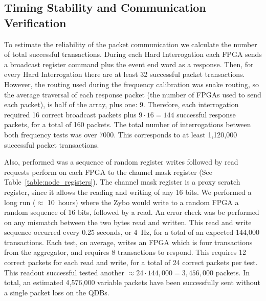 




\subsection{Timing Stability and Communication Verification}
\label{sec:timing_test_results}
To estimate the reliability of the packet communication we calculate the number of total successful transactions.
During each Hard Interrogation each FPGA sends a broadcast register command plus the event end word as a response.
Then, for every Hard Interrogation there are at least 32 successful packet transactions. 
However, the routing used during the frequency calibration was snake routing, so the average traversal of each response packet (the number of FPGAs used to send each packet), is half of the array, plus one: 9.
Therefore, each interrogation required 16 correct broadcast packets plus $9\cdot 16 = 144$ successful response packets, for a total of 160 packets.
The total number of interrogations between both frequency tests was over 7000.
This corresponds to at least 1,120,000 successful packet transactions.

Also, performed was a sequence of random register writes followed by read requests perform on each FPGA to the channel mask register (See Table~\ref{table:node_registers}).
The channel mask register is a proxy scratch register, since it allows the reading and writing of any 16 bits.
We performed a long run ($\approx$ 10~\unit{hours}) where the Zybo would write to a random FPGA a random sequence of 16 bits, followed by a read.
An error check was be performed on any mismatch between the two bytes read and written.
This read and write sequence occurred every 0.25 seconds, or 4~\unit{Hz}, for a total of an expected 144,000 transactions.
Each test, on average, writes an FPGA which is four transactions from the aggregator, and requires 8 transactions to respond.
This requires 12 correct packets for each read and write, for a total of 24 correct packets per test.
This readout successful tested another $\approx 24\cdot 144,000 = 3,456,000$ packets.
In total, an estimated 4,576,000 variable packets have been successfully sent without a single packet loss on the QDBs.

